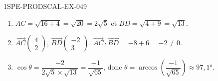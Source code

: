\begin{corrige}{1SPE-PRODSCAL-EX-049}
\begin{enumerate}
\item $AC = \sqrt{16 + 4} = \sqrt{20} = 2\sqrt{5}$ et $BD = \sqrt{4 + 9} = \sqrt{13}$.
\item $\overrightarrow{AC}\begin{pmatrix} 4 \\ 2 \end{pmatrix}$, $\overrightarrow{BD}\begin{pmatrix} -2 \\ 3 \end{pmatrix}$. $\overrightarrow{AC} \cdot \overrightarrow{BD} = -8 + 6 = -2
\neq 0$.
\item $\cos\theta = \dfrac{-2}{2\sqrt{5} \times \sqrt{13}} = \dfrac{-1}{\sqrt{65}}$, donc $\theta = \arccos\!\left(\dfrac{-1}{\sqrt{65}}\right) \approx 97{,}1°$.
\end{enumerate}
\end{corrige}

